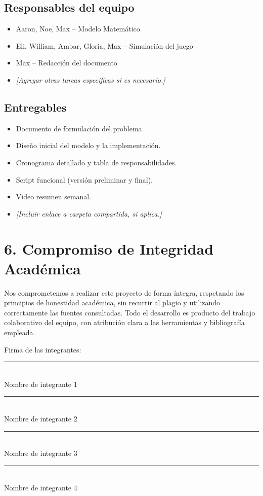 \documentclass[12pt]{article}
\begin{document}
\subsection*{Responsables del equipo}
\begin{itemize}
    \item Aaron, Noe, Max – Modelo Matemático
    \item Eli, William, Ambar, Gloria, Max – Simulación del juego
    \item Max – Redacción del documento
    \item \textit{[Agregar otras tareas específicas si es necesario.]}
\end{itemize}

\subsection*{Entregables}
\begin{itemize}
    \item Documento de formulación del problema.
    \item Diseño inicial del modelo y la implementación.
    \item Cronograma detallado y tabla de responsabilidades.
    \item Script funcional (versión preliminar y final).
    \item Video resumen semanal.
    \item \textit{[Incluir enlace a carpeta compartida, si aplica.]}
\end{itemize}

\section*{6. Compromiso de Integridad Académica}

Nos comprometemos a realizar este proyecto de forma íntegra, respetando los principios de honestidad académica, sin recurrir al plagio y utilizando correctamente las fuentes consultadas. Todo el desarrollo es producto del trabajo colaborativo del equipo, con atribución clara a las herramientas y bibliografía empleada.

\vspace{1cm}
\noindent Firma de las integrantes:  
\vspace{0.5cm}

\noindent \rule{7cm}{0.4pt} \\
Nombre de integrante 1

\vspace{0.5cm}
\noindent \rule{7cm}{0.4pt} \\
Nombre de integrante 2

\vspace{0.5cm}
\noindent \rule{7cm}{0.4pt} \\
Nombre de integrante 3

\vspace{0.5cm}
\noindent \rule{7cm}{0.4pt} \\
Nombre de integrante 4
\end{document}
